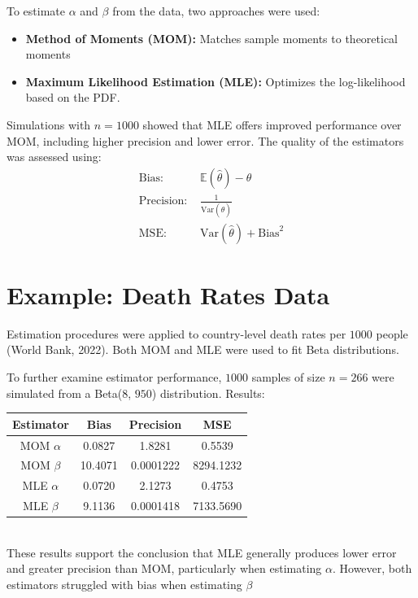 \documentclass{article}\usepackage[]{graphicx}\usepackage[]{xcolor}
\begin{document}
\begin{multicols}{2}
To estimate $\alpha$ and $\beta$ from the data, two approaches were used: 
\begin{itemize}
\item \textbf{Method of Moments (MOM):} Matches sample moments to theoretical moments
\item \textbf{Maximum Likelihood Estimation (MLE):} Optimizes the log-likelihood based on the PDF.
\end{itemize}
Simulations with $n = 1000$ showed that MLE offers improved performance over MOM, including higher precision and lower error. The quality of the estimators was assessed using:
\begin{align*}
\text{Bias: } & \mathbb{E}(\hat{\theta}) - \theta \\
\text{Precision: } & \frac{1}{\text{Var}(\hat{\theta})} \\
\text{MSE: } & \text{Var}(\hat{\theta}) + \text{Bias}^2
\end{align*}

\section{Example: Death Rates Data}

\indent Estimation procedures were applied to country-level death rates per $1000$ people (World Bank, 2022). Both MOM and MLE were used to fit Beta distributions.

To further examine estimator performance, $1000$ samples of size $n = 266$ were simulated from a Beta($8$, $950$) distribution. Results:
\begin{tabular}{|c|c|c|c|}
\hline
Estimator & Bias & Precision & MSE \\
\hline
MOM $\alpha$ & 0.0827 & 1.8281 & 0.5539 \\
MOM $\beta$ & 10.4071 & 0.0001222 & 8294.1232 \\
MLE $\alpha$ & 0.0720 & 2.1273 & 0.4753 \\
MLE $\beta$ & 9.1136 & 0.0001418 & 7133.5690 \\
\hline
\end{tabular}\\
These results support the conclusion that MLE generally produces lower error and greater precision than MOM, particularly when estimating $\alpha$. However, both estimators struggled with bias when estimating $\beta$

\vspace{2em}

\citep{patch}

\begin{tiny}

\end{tiny}
\end{multicols}
\end{document}
